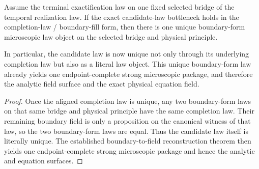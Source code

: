 \begin{theorem}
\label{thm:canonical-boundary-microscopic-law-object-target}
Assume the terminal exactification law on one fixed selected bridge of the
temporal realization law. If the exact candidate-law bottleneck holds in the
completion-law / boundary-fill form, then there is one unique boundary-form
microscopic law object on the selected bridge and physical principle.

In particular, the candidate law is now unique not only through its underlying
completion law but also as a literal law object. This unique boundary-form law
already yields one endpoint-complete strong microscopic package, and therefore
the analytic field surface and the exact physical equation field.
\end{theorem}

\begin{proof}
Once the aligned completion law is unique, any two boundary-form laws on that
same bridge and physical principle have the same completion law. Their
remaining boundary field is only a proposition on the canonical witness of that
law, so the two boundary-form laws are equal. Thus the candidate law itself is
literally unique. The established boundary-to-field reconstruction theorem
then yields one endpoint-complete strong microscopic package and hence the
analytic and equation surfaces.
\end{proof}

